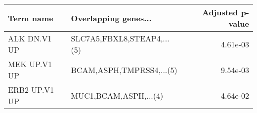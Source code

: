 \begin{tabular}{llr}
\toprule
    Term name &       Overlapping genes... &  Adjusted p-value \\
\midrule
 ALK DN.V1 UP & SLC7A5,FBXL8,STEAP4,...(5) &          4.61e-03 \\
 MEK UP.V1 UP &   BCAM,ASPH,TMPRSS4,...(5) &          9.54e-03 \\
ERB2 UP.V1 UP &      MUC1,BCAM,ASPH,...(4) &          4.64e-02 \\
\bottomrule
\end{tabular}

